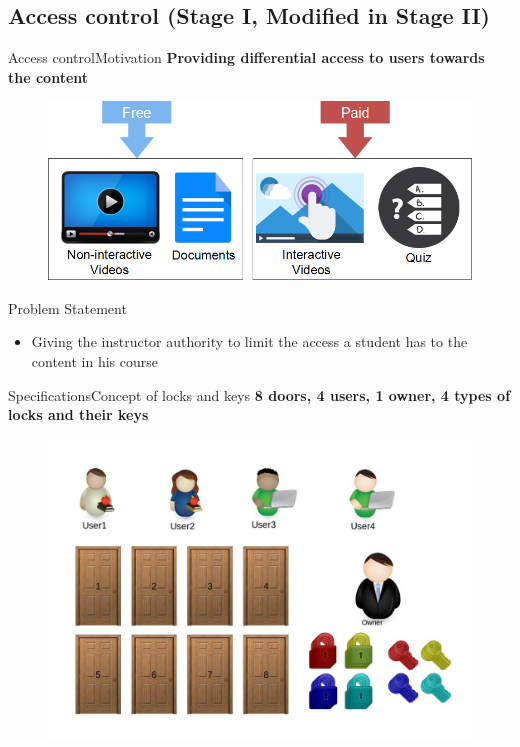 \documentclass[xcolor=table]{beamer}
\begin{document}
\subsection{Access control (Stage I, Modified in Stage II)}

\begin{frame}{Access control}{Motivation}
	\textbf{Providing differential access to users towards the content}
	\begin{figure}
	\centering
	\includegraphics[width=0.6\linewidth]{media/AccessControl}
	\label{fig:AccessControl}
	\end{figure}
	\begin{block}{Problem Statement}
		\begin{itemize}
			\item Giving the instructor authority to limit the access a student has to the content in his course
		\end{itemize}
	\end{block}
\end{frame}

\begin{frame}{Specifications}{Concept of locks and keys}
	\textbf{8 doors, 4 users, 1 owner, 4 types of locks and their keys}
	\begin{figure}
		\centering
		\includegraphics[width=0.7\linewidth]{./media/1}
		\label{fig:1}
	\end{figure}
\end{frame}
\end{document}
